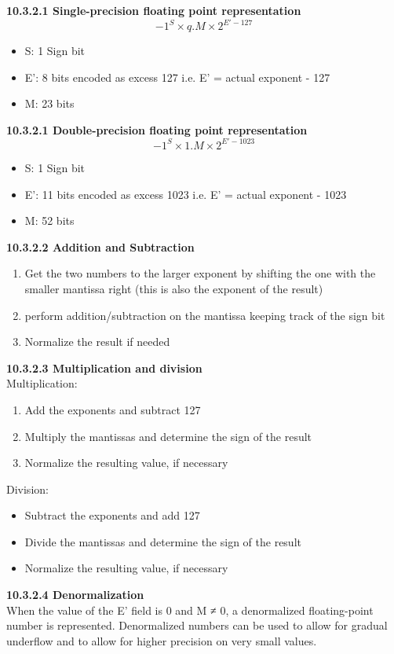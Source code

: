 \documentclass[10pt]{article}
\begin{document}
\textbf{10.3.2.1 Single-precision  floating point representation}
$$-1^S \times q.M \times 2^{E' - 127}$$
\begin{itemize}
    \item S: 1 Sign bit
    \item E': 8 bits encoded as excess 127 i.e. E' = actual exponent - 127
    \item M: 23 bits
\end{itemize}
\textbf{10.3.2.1 Double-precision  floating point representation}
$$-1^S \times 1.M \times 2^{E' - 1023}$$
\begin{itemize}
    \item S: 1 Sign bit
    \item E': 11 bits encoded as excess 1023 i.e. E' = actual exponent - 1023
    \item M: 52 bits
\end{itemize}
\textbf{10.3.2.2 Addition and Subtraction}
\begin{enumerate}
    \item Get the two numbers to the larger exponent by shifting the one with the smaller mantissa right (this is also the exponent of the result)
    \item perform addition/subtraction on the mantissa keeping track of the sign bit
    \item Normalize the result if needed
\end{enumerate}
\textbf{10.3.2.3 Multiplication and division}\\
Multiplication:
\begin{enumerate}
    \item Add the exponents and subtract 127
    \item Multiply the mantissas and determine the sign of the result
    \item Normalize the resulting value, if necessary
\end{enumerate}
Division:
\begin{itemize}
    \item Subtract the exponents and add 127
    \item Divide the mantissas and determine the sign of the result
    \item Normalize the resulting value, if necessary\\
\end{itemize}
\newpage
\textbf{10.3.2.4 Denormalization}\\
When the value of the E’ field is 0 and M ≠ 0, a denormalized
floating-point number is represented. Denormalized numbers can be used to allow for gradual underflow and to allow for higher precision on very small values.
\end{document}
